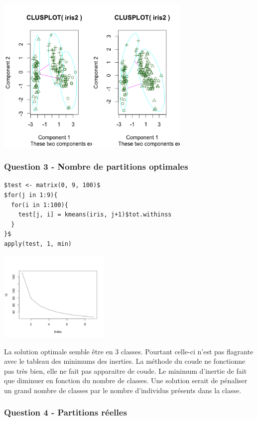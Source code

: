 \documentclass[a4paper,12pt]{report}
\begin{document}
\includegraphics[width=0.7\textwidth]{ex2_iris_2.png}

 
\subsubsection*{Question 3 - Nombre de partitions optimales}

\begin{verbatim}
$test <- matrix(0, 9, 100)$
$for(j in 1:9){
  for(i in 1:100){
    test[j, i] = kmeans(iris, j+1)$tot.withinss
  }
}$
apply(test, 1, min)
\end{verbatim}

\includegraphics[width=0.4\textwidth]{ex2_iris_3.png}


La solution optimale semble être en 3 classes. Pourtant celle-ci n'est pas flagrante avec le tableau des minimums des inerties. La méthode du coude ne fonctionne pas très bien, elle ne fait pas apparaitre de coude. Le minimum d'inertie de  fait que diminuer en fonction du nombre de classes. 
Une solution serait de pénaliser un grand nombre de classes par le nombre d'individus présents dans la classe.

\subsubsection*{Question 4 - Partitions réelles}
\end{document}
